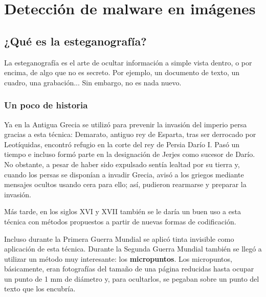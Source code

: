 \chapter{Detección de malware en imágenes}
\label{ch:det_mal}


\section{¿Qué es la esteganografía?}

La esteganografía es el arte de ocultar información a simple vista dentro, o por encima, de algo que no es secreto. Por ejemplo, un documento de texto, un cuadro, una grabación... Sin embargo, no es nada nuevo.%

\subsection{Un poco de historia}

Ya en la Antigua Grecia se utilizó para prevenir la invasión del imperio persa gracias a esta técnica: Demarato, antiguo rey de Esparta, tras ser derrocado por Leotíquidas, encontró refugio en la corte del rey de Persia Darío I. Pasó un tiempo e incluso formó parte en la designación de Jerjes como sucesor de Darío. No obstante, a pesar de haber sido expulsado sentía lealtad por su tierra y, cuando los persas se disponían a invadir Grecia, avisó a los griegos mediante mensajes ocultos usando cera para ello; así, pudieron rearmarse y preparar la invasión. %

Más tarde, en los siglos XVI y XVII también se le daría un buen uso a esta técnica con métodos propuestos a partir de nuevas formas de codificación.%

Incluso durante la Primera Guerra Mundial se aplicó tinta invisible como aplicación de esta técnica. Durante la Segunda Guerra Mundial también se llegó a utilizar un método muy interesante: los \textbf{micropuntos}. Los micropuntos, básicamente, eran fotografías del tamaño de una página reducidas hasta ocupar un punto de 1 mm de diámetro y, para ocultarlos, se pegaban sobre un punto del texto que los encubría. %